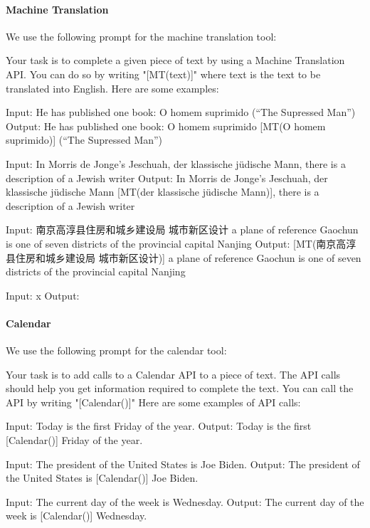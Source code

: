 \documentclass[11pt]{article}
\begin{document}
\begin{CJK*}{UTF8}{gbsn}
\paragraph{Machine Translation} We use the following prompt for the machine translation tool:

{\small
\begin{spverbatim}
Your task is to complete a given piece of text by using a Machine Translation API.
You can do so by writing "[MT(text)]" where text is the text to be translated into English. 
Here are some examples:

Input: He has published one book: O homem suprimido (“The Supressed Man”)
Output: He has published one book: O homem suprimido [MT(O homem suprimido)] (“The Supressed Man”) 

Input: In Morris de Jonge’s Jeschuah, der klassische jüdische Mann, there is a description of a Jewish writer
Output: In Morris de Jonge’s Jeschuah, der klassische jüdische Mann [MT(der klassische jüdische Mann)], there is a description of a Jewish writer

Input: 南京高淳县住房和城乡建设局 城市新区设计 a plane of reference Gaochun is one of seven districts of the provincial capital Nanjing 
Output: [MT(南京高淳县住房和城乡建设局 城市新区设计)] a plane of reference Gaochun is one of seven districts of the provincial capital Nanjing 

Input: x
Output:
\end{spverbatim}}



\paragraph{Calendar} We use the following prompt for the calendar tool:

{\small
\begin{spverbatim}
Your task is to add calls to a Calendar API to a piece of text. The API calls should help you get information required to complete the text. You can call the API by writing "[Calendar()]" Here are some examples of API calls:

Input: Today is the first Friday of the year.
Output: Today is the first [Calendar()] Friday of the year.

Input: The president of the United States is Joe Biden.
Output: The president of the United States is [Calendar()] Joe Biden.

Input: The current day of the week is Wednesday. 
Output: The current day of the week is [Calendar()] Wednesday.


\end{spverbatim}}
\end{CJK*}
\end{document}

